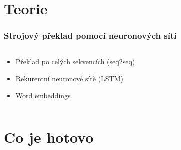 \documentclass[pdf,fyma2]{beamer}
\begin{document}
\section{Teorie}
\begin{frame}
\frametitle{Strojový překlad pomocí neuronových sítí}
  \begin{columns}[T]
    \begin{column}{.3\textwidth}

        \begin{itemize}
              \item Překlad po celých sekvencích (seq2seq)
              \item Rekurentní neuronové sítě (LSTM)
              \item Word embeddings
        \end{itemize}

    \end{column}

    \begin{column}{.8\textwidth}
        \begin{figure}[T]
        \end{figure}
    \end{column}

  \end{columns}
\end{frame}


\section{Co je hotovo}
\end{document}

